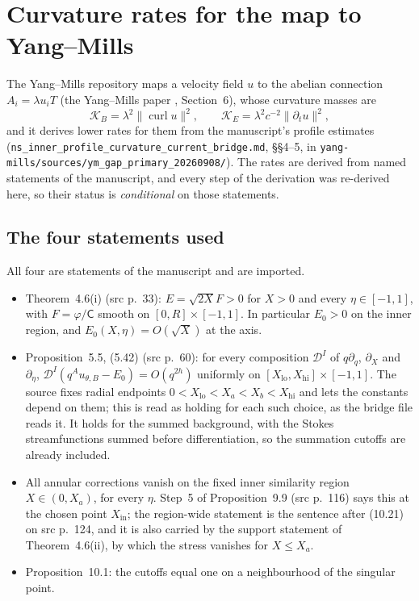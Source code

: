 \section{Curvature rates for the map to Yang--Mills}\label{sec:rates}

The Yang--Mills repository maps a velocity field $u$ to the abelian connection $A_i=\lambda u_iT$ (the Yang--Mills paper \cite{YMPaper}, Section~6), whose curvature masses are
\[
\mathcal K_B=\lambda^2\|\operatorname{curl}u\|^2,\qquad \mathcal K_E=\lambda^2c^{-2}\|\partial_tu\|^2,
\]
and it derives lower rates for them from the manuscript's profile estimates (\texttt{ns\_inner\_\allowbreak profile\_\allowbreak curvature\_\allowbreak current\_\allowbreak bridge.md}, §§4--5, in \texttt{yang-mills/\allowbreak sources/\allowbreak ym\_gap\_primary\_20260908/}). The rates are derived from named statements of the manuscript, and every step of the derivation was re-derived here, so their status is \emph{conditional} on those statements.

\subsection{The four statements used}

All four are statements of the manuscript and are imported.
\begin{itemize}
\item[(H1)] Theorem~4.6(i) (src p.~33): $E=\sqrt{2X}F>0$ for $X>0$ and every $\eta\in[-1,1]$, with $F=\varphi/\mathsf C$ smooth on $[0,R]\times[-1,1]$. In particular $E_0>0$ on the inner region, and $E_0(X,\eta)=O(\sqrt X)$ at the axis.
\item[(H2)] Proposition~5.5, (5.42) (src p.~60): for every composition $\mathcal D^I$ of $q\partial_q$, $\partial_X$ and $\partial_\eta$, $\mathcal D^I(q^Au_{\theta,B}-E_0)=O(q^{2h})$ uniformly on $[X_{\mathrm{lo}},X_{\mathrm{hi}}]\times[-1,1]$. The source fixes radial endpoints $0<X_{\mathrm{lo}}<X_a<X_b<X_{\mathrm{hi}}$ and lets the constants depend on them; this is read as holding for each such choice, as the bridge file reads it. It holds for the summed background, with the Stokes streamfunctions summed before differentiation, so the summation cutoffs are already included.
\item[(H3)] All annular corrections vanish on the fixed inner similarity region $X\in(0,X_a)$, for every $\eta$. Step~5 of Proposition~9.9 (src p.~116) says this at the chosen point $X_{\mathrm{in}}$; the region-wide statement is the sentence after (10.21) on src p.~124, and it is also carried by the support statement of Theorem~4.6(ii), by which the stress vanishes for $X\le X_a$.
\item[(H4)] Proposition~10.1: the cutoffs equal one on a neighbourhood of the singular point.
\end{itemize}

